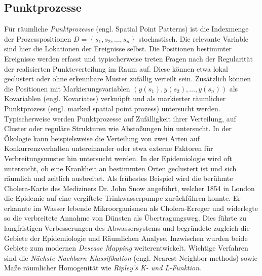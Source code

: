 \subsection*{Punktprozesse}
Für räumliche \emph{Punktprozesse} (engl. Spatial Point Patterns) ist die 
Indexmenge der Prozesspositionen $D=\left\{  s_1 , s_2 ,\ldots , s_n \right\}$ 
stochastisch. Die relevante Variable sind hier die Lokationen der Ereignisse selbst. 
Die Positionen bestimmter Ereignisse werden erfasst und typischerweise treten Fragen nach 
der Regularität der realisierten Punkteverteilung im Raum auf. Diese können etwa lokal 
geclustert oder ohne erkennbare Muster zufällig verteilt sein. Zusätzlich können die
Positionen mit Markierungsvariablen $ \left( y(s_1),y(s_2),\ldots,y(s_n) \right)$ 
als Kovariablen (engl. Kovariates) verknüpft und als 
markierter räumlicher Punktprozess (engl. marked spatial point prozess) untersucht werden.	
Typischerweise werden Punktprozesse auf Zufälligkeit ihrer Verteilung, auf Cluster oder 
reguläre Strukturen wie Abstoßungen hin untersucht.
In der Ökologie kann beispielsweise die Verteilung von zwei Arten auf 
Konkurrenzverhalten untereinander oder etwa externe Faktoren für Verbreitungsmuster 
hin untersucht werden. In der Epidemiologie wird oft untersucht, ob eine Krankheit 
an bestimmten Orten geclustert ist und sich räumlich und zeitlich ausbreitet. 
Als frühestes Beispiel wird die berühmte Cholera-Karte des Mediziners Dr. John Snow angeführt, 
welcher 1854 in London die Epidemie auf eine vergiftete Trinkwasserpumpe zurückführen konnte. 
Er erkannte im Wasser lebende Mikroorganismen als Cholera-Erreger und widerlegte so die 
verbreitete Annahme von  Dünsten\grqq{} als Übertragungsweg. Dies führte zu 
langfristigen Verbesserungen des Abwassersystems und begründete zugleich die Gebiete 
der Epidemiologie und Räumlichen Analyse. Inzwischen wurden beide Gebiete zum 
modernen \emph{Desease Mapping} weiterentwickelt.
Wichtige Verfahren sind die \emph{Nächste-Nachbarn-Klassifikation} 
(engl. Nearest-Neighbor methods) 
sowie Maße räumlicher Homogenität wie \emph{Ripley's K- und L-Funktion}.

